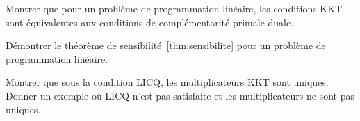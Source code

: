 \begin{exercice}[$\star\star$]
Montrer que pour un probl\`eme de programmation lin\'eaire, les conditions KKT
sont \'equivalentes aux conditions de compl\'ementarit\'e primale-duale.
\end{exercice}

\begin{exercice}[$\star\star\star$]
D\'emontrer le th\'eor\`eme de sensibilit\'e~\ref{thm:sensibilite} pour un
probl\`eme de programmation lin\'eaire.
\end{exercice}

\begin{exercice}[$\star\star\star$]
Montrer que sous la condition LICQ, les multiplicateurs KKT sont uniques.
Donner un exemple o\`u LICQ n'est pas satisfaite et les multiplicateurs ne
sont pas uniques.
\end{exercice}
